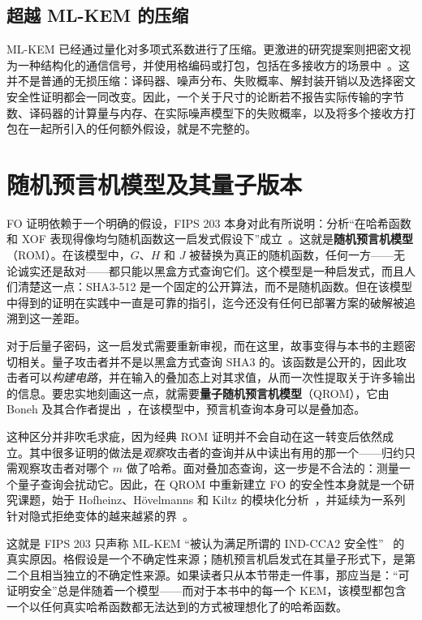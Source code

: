 \subsection{超越 ML-KEM 的压缩}

ML-KEM 已经通过量化对多项式系数进行了压缩。更激进的研究提案则把密文视为一种结构化的通信信号，并使用格编码或打包，包括在多接收方的场景中~\cite{latticecodedkyber2025}。这并不是普通的无损压缩：译码器、噪声分布、失败概率、解封装开销以及选择密文安全性证明都会一同改变。因此，一个关于尺寸的论断若不报告实际传输的字节数、译码器的计算量与内存、在实际噪声模型下的失败概率，以及将多个接收方打包在一起所引入的任何额外假设，就是不完整的。

\section{随机预言机模型及其量子版本}
\label{sec:qrom}

FO 证明依赖于一个明确的假设，FIPS 203 本身对此有所说明：分析“在哈希函数和 XOF 表现得像均匀随机函数这一启发式假设下”成立~\cite{fips203}。这就是\textbf{随机预言机模型}（ROM）。在该模型中，$G$、$H$ 和 $J$ 被替换为真正的随机函数，任何一方——无论诚实还是敌对——都只能以黑盒方式查询它们。这个模型是一种启发式，而且人们清楚这一点：SHA3-512 是一个固定的公开算法，而不是随机函数。但在该模型中得到的证明在实践中一直是可靠的指引，迄今还没有任何已部署方案的破解被追溯到这一差距。

对于后量子密码，这一启发式需要重新审视，而在这里，故事变得与本书的主题密切相关。量子攻击者并不是以黑盒方式查询 SHA3 的。该函数是公开的，因此攻击者可以\emph{构建电路}，并在输入的叠加态上对其求值，从而一次性提取关于许多输出的信息。要忠实地刻画这一点，就需要\textbf{量子随机预言机模型}（QROM），它由 Boneh 及其合作者提出~\cite{qrom2011}，在该模型中，预言机查询本身可以是叠加态。

这种区分并非吹毛求疵，因为经典 ROM 证明并不会自动在这一转变后依然成立。其中很多证明的做法是\emph{观察}攻击者的查询并从中读出有用的那一个——归约只需观察攻击者对哪个 $m$ 做了哈希。面对叠加态查询，这一步是不合法的：测量一个量子查询会扰动它。因此，在 QROM 中重新建立 FO 的安全性本身就是一个研究课题，始于 Hofheinz、H\"ovelmanns 和 Kiltz 的模块化分析~\cite{hhk2017}，并延续为一系列针对隐式拒绝变体的越来越紧的界~\cite{sxy2018}。

这就是 FIPS 203 只声称 ML-KEM “被认为满足所谓的 IND-CCA2 安全性”~\cite{fips203} 的真实原因。格假设是一个不确定性来源；随机预言机启发式在其量子形式下，是第二个且相当独立的不确定性来源。如果读者只从本节带走一件事，那应当是：“可证明安全”总是伴随着一个模型——而对于本书中的每一个 KEM，该模型都包含一个以任何真实哈希函数都无法达到的方式被理想化了的哈希函数。

